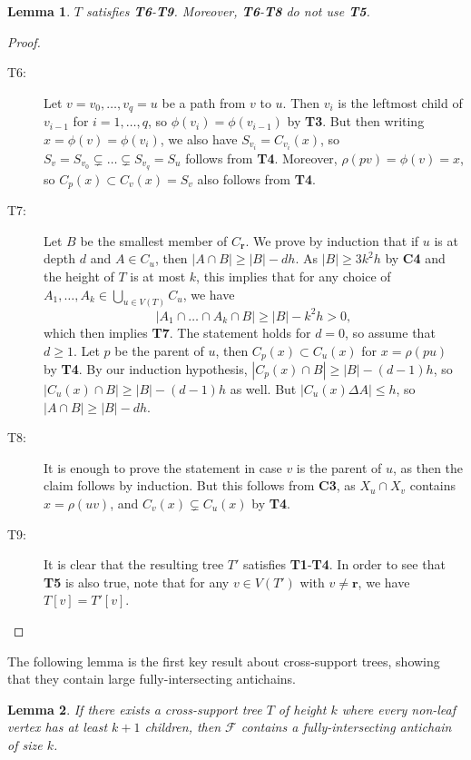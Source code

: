 \documentclass[11pt]{article}
\newtheorem{lemma}[lemma]{Lemma}
\theoremstyle{definition}
\begin{document}
\begin{lemma}\label{lemma:T}
$T$ satisfies \textbf{T6}-\textbf{T9}. Moreover, \textbf{T6}-\textbf{T8} do not use \textbf{T5}.
\end{lemma}
\begin{proof}
\ 
\begin{description}
    \item[T6:] Let $v=v_0,\dots,v_q=u$ be a path from $v$ to $u$. Then $v_i$ is the leftmost child of $v_{i-1}$ for $i=1,\dots,q$, so $\phi(v_i)=\phi(v_{i-1})$ by \textbf{T3}. But then writing $x=\phi(v)=\phi(v_i)$, we also have $S_{v_i}=C_{v_i}(x)$, so $S_v=S_{v_0}\subsetneq\dots \subsetneq S_{v_q}=S_u$ follows from \textbf{T4}. Moreover, $\rho(pv)=\phi(v)=x$, so $C_p(x)\subset C_v(x)=S_v$ also follows from \textbf{T4}.
    \item[T7:] Let $B$ be the smallest member of $C_{\mathbf{r}}$. We prove by induction that if $u$ is at depth $d$ and $A\in C_u$, then $|A\cap B|\geq |B|-dh$. As $|B|\geq 3k^2h$ by \textbf{C4} and the height of $T$ is at most $k$, this implies that for any choice of $A_1,\dots,A_k\in \bigcup_{u\in V(T)} C_u$, we have
    $$|A_1\cap\dots\cap A_k\cap B|\geq |B|-k^2h>0,$$ which then implies \textbf{T7}. The statement holds for $d=0$, so assume that $d\geq 1$. Let $p$ be the parent of $u$, then $C_p(x)\subset C_u(x)$ for $x=\rho(pu)$ by \textbf{T4}. By our induction hypothesis, $|C_p(x)\cap B|\geq |B|-(d-1)h$, so $|C_u(x)\cap B|\geq |B|-(d-1)h$ as well. But $|C_u(x)\Delta A|\leq h$, so $|A\cap B|\geq |B|-dh$.
    \item[T8:] It is enough to prove the statement in case $v$ is the parent of $u$, as then the claim follows by induction. But this follows from \textbf{C3}, as $X_u\cap X_v$ contains $x=\rho(uv)$, and $C_v(x)\subsetneq C_u(x)$ by \textbf{T4}.
    \item[T9:] It is clear that the resulting tree $T'$ satisfies \textbf{T1}-\textbf{T4}. In order to see that \textbf{T5} is also true, note that for any $v\in V(T')$ with $v\neq \mathbf{r}$, we have $T[v]=T'[v]$.
\end{description}
\end{proof}

The following lemma is the first key result about cross-support trees, showing that they contain large fully-intersecting antichains.

\begin{lemma}\label{lemma:kcross}
If there exists a cross-support tree $T$ of height $k$ where every non-leaf vertex has at least $k+1$ children, then $\mathcal{F}$ contains a fully-intersecting antichain of size $k$.
\end{lemma}
\end{document}
